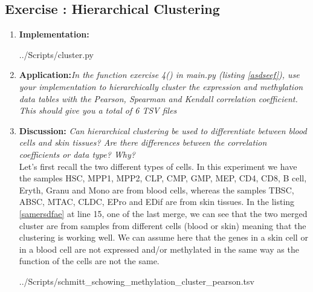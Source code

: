 \documentclass[10pt,a4paper]{article}
\newcommand{\exercise}[1]
{
  \stepcounter{subsection}
  \subsection*{Exercise \thesubsection: #1}

}
\begin{document}
\newpage
\exercise{Hierarchical Clustering}
\begin{enumerate}
	
	\item \textbf{Implementation: }
	
	 {../Scripts/cluster.py}
	
	\item \textbf{Application:}\textit{In the function exercise 4() in main.py (listing \ref{asdseef}), use your implementation to hierarchically cluster the expression and methylation data tables with the Pearson, Spearman and Kendall correlation coefficient. This should give you a total of 6 TSV files}\\
	
	
	\item \textbf{Discussion: }\textit{Can hierarchical clustering be used to differentiate between blood cells and skin tissues? Are there differences between the correlation coefficients or data type? Why?}\\
	
	Let's first recall the two different types of cells. In this experiment we have the samples HSC, MPP1, MPP2, CLP, CMP, GMP, MEP, CD4, CD8, B cell, Eryth, Granu and Mono are from blood cells, whereas the samples TBSC, ABSC, MTAC, CLDC, EPro
	and EDif are from skin tissues. In the listing \ref{samersdfae} at line 15, one of the last merge, we can see that the two merged cluster are from samples from different cells (blood or skin) meaning that the clustering is working well. We can assume here that the genes in a skin cell or in a blood cell are not expressed and/or methylated in the same way as the function of the cells are not the same. 
	
	 {../Scripts/schmitt\string_schowing\string_methylation\string_cluster\string_pearson.tsv}
	
	
	
\end{enumerate}
\end{document}
